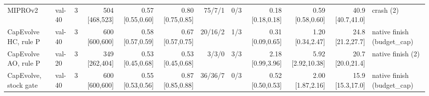 \begin{table}[t]
{\begin{tabular}{@{}llrrrrrrrrrl@{}}
MIPROv2 & val-40 & 3 & 504 {\tiny[468,523]} & 0.57 {\tiny[0.55,0.60]} & 0.80 {\tiny[0.75,0.85]} & 75/7/1 & 0/3 & 0.18 {\tiny[0.18,0.18]} & 0.59 {\tiny[0.58,0.60]} & 40.9 {\tiny[40.7,41.0]} & crash (2) \\
CapEvolve HC, rule P & val-40 & 3 & 600 {\tiny[600,600]} & 0.58 {\tiny[0.57,0.59]} & 0.67 {\tiny[0.57,0.75]} & 20/16/2 & 1/3 & 0.31 {\tiny[0.09,0.65]} & 1.20 {\tiny[0.34,2.47]} & 24.8 {\tiny[21.2,27.7]} & native finish (budget\_cap) \\
CapEvolve AO, rule P & val-20 & 3 & 349 {\tiny[262,404]} & 0.53 {\tiny[0.45,0.68]} & 0.53 {\tiny[0.45,0.68]} & 3/3/0 & 3/3 & 2.18 {\tiny[0.99,3.96]} & 5.92 {\tiny[2.92,10.38]} & 20.7 {\tiny[20.0,21.4]} & native finish (2) \\
CapEvolve, stock gate & val-40 & 3 & 600 {\tiny[600,600]} & 0.55 {\tiny[0.53,0.56]} & 0.87 {\tiny[0.85,0.88]} & 36/36/7 & 0/3 & 0.52 {\tiny[0.50,0.53]} & 2.00 {\tiny[1.87,2.16]} & 15.9 {\tiny[15.3,17.0]} & native finish (budget\_cap) \\
\bottomrule
\end{tabular}}
\end{table}
